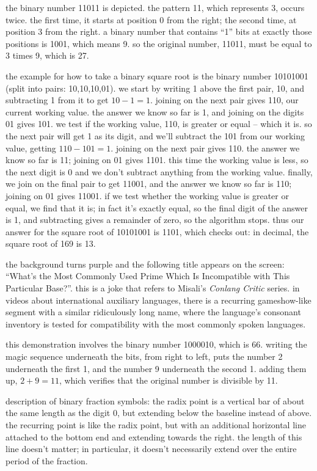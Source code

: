 \documentclass[../footnotes.tex]{subfiles}
\begin{document}
 the binary number 11011 is depicted. the pattern 11, which represents 3, occurs twice. the first time, it starts at position 0 from the right; the second time, at position 3 from the right. a binary number that contains ``1'' bits at exactly those positions is 1001, which means 9. so the original number, 11011, must be equal to 3 times 9, which is 27.

 the example for how to take a binary square root is the binary number 10101001 (split into pairs: 10,10,10,01). we start by writing 1 above the first pair, 10, and subtracting 1 from it to get $10 - 1 = 1$. joining on the next pair gives 110, our current working value. the answer we know so far is 1, and joining on the digits 01 gives 101. we test if the working value, 110, is greater or equal -- which it is. so the next pair will get 1 as its digit, and we'll subtract the 101 from our working value, getting $110 - 101 = 1$. joining on the next pair gives 110. the answer we know so far is 11; joining on 01 gives 1101. this time the working value is less, so the next digit is 0 and we don't subtract anything from the working value. finally, we join on the final pair to get 11001, and the answer we know so far is 110; joining on 01 gives 11001. if we test whether the working value is greater or equal, we find that it is; in fact it's exactly equal, so the final digit of the answer is 1, and subtracting gives a remainder of zero, so the algorithm stops. thus our answer for the square root of 10101001 is 1101, which checks out: in decimal, the square root of 169 is 13.

 the background turns purple and the following title appears on the screen: ``What's the Most Commonly Used Prime Which Is Incompatible with This Particular Base?\texttrademark''. this is a joke that refers to Misali's {\it Conlang Critic} series. in videos about international auxiliary languages, there is a recurring gameshow-like segment with a similar ridiculously long name, where the language's consonant inventory is tested for compatibility with the most commonly spoken languages.

 this demonstration involves the binary number 1000010, which is 66. writing the magic sequence underneath the bits, from right to left, puts the number 2 underneath the first 1, and the number 9 underneath the second 1. adding them up, $2 + 9 = 11$, which verifies that the original number is divisible by 11.

 description of binary fraction symbols: the radix point is a vertical bar of about the same length as the digit 0, but extending below the baseline instead of above. the recurring point is like the radix point, but with an additional horizontal line attached to the bottom end and extending towards the right. the length of this line doesn't matter; in particular, it doesn't necessarily extend over the entire period of the fraction.
\end{document}
